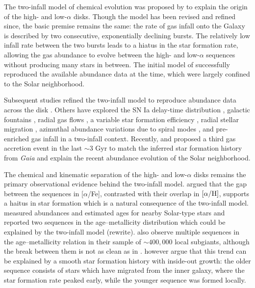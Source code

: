 \documentclass[twocolumn,twocolappendix,linenumbers]{aastex631}
\newcommand{\todo}[1]{{\color{red}#1}}
\newcommand{\aFe}{[$\alpha$/Fe]\xspace}
\begin{document}
The two-infall model of chemical evolution was proposed by \citet{chiappini_chemical_1997} to explain the origin of the high- and low-$\alpha$ disks. Though the model has been revised and refined since, the basic premise remains the same: the rate of gas infall onto the Galaxy is described by two consecutive, exponentially declining bursts. The relatively low infall rate between the two bursts leads to a hiatus in the star formation rate, allowing the gas abundance to evolve between the high- and low-$\alpha$ sequences without producing many stars in between. 
The initial model of \citet{chiappini_chemical_1997} successfully reproduced the available abundance data at the time, which were largely confined to the Solar neighborhood.

Subsequent studies refined the two-infall model to reproduce abundance data across the disk \citep[e.g.,][]{chiappini_abundance_2001,chiappini_oxygen_2003}. Others have explored the SN Ia delay-time distribution \citep{matteucci_effect_2009,palicio_analytic_2023}, galactic fountains \citep{spitoni_effects_2009}, radial gas flows \citep{spitoni_effects_2011,palla_chemical_2020}, a variable star formation efficiency \citep{spitoni_effects_2011,palla_chemical_2020}, radial stellar migration \citep{spitoni_effect_2015,palla_mgfe_2022}, azimuthal abundance variations due to spiral modes \citep{spitoni_2d_2019}, and pre-enriched gas infall \citep{palla_chemical_2020,spitoni_remind_2024} in a two-infall context. Recently, \citet{spitoni_beyond_2023} and \citet{palla_mapping_2024} proposed a third gas accretion event in the last $\sim3$ Gyr to match the inferred star formation history from {\it Gaia} \citep{ruiz-lara_recurrent_2020} and explain the recent abundance evolution of the Solar neighborhood.

The chemical and kinematic separation of the high- and low-$\alpha$ disks remains the primary observational evidence behind the two-infall model. \citet{spitoni_remind_2024} argued that the gap between the sequences in \aFe, contrasted with their overlap in $[\alpha/{\rm H}]$, supports a haitus in star formation which is a natural consequence of the two-infall model. \citet{nissen_high-precision_2020} measured abundances and estimated ages for nearby Solar-type stars and reported two sequences in the age--metallicity distribution which could be explained by the two-infall model \todo{(rewrite)}. \citet{nataf_accurate_2024} also observe multiple sequences in the age--metallicity relation in their sample of $\sim400,000$ local subgiants, although the break between them is not as clean as in \citet{nissen_high-precision_2020}. \citet{chen_recent_2025} however argue that this trend can be explained by a smooth star formation history with inside-out growth: the older sequence consists of stars which have migrated from the inner galaxy, where the star formation rate peaked early, while the younger sequence was formed locally. 
\end{document}
